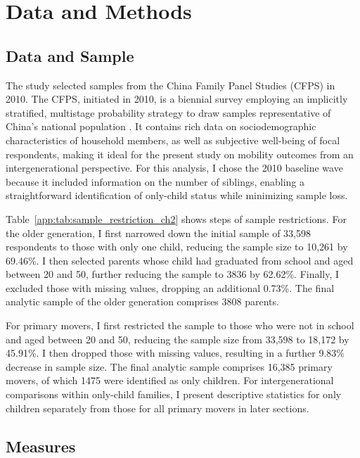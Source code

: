 \section{Data and Methods}
\label{sec:ch2-data-methods}

\subsection{Data and Sample}

The study selected samples from the China Family Panel Studies (CFPS) in 2010. The CFPS, initiated in 2010, is a biennial survey employing an implicitly stratified, multistage probability strategy to draw samples representative of China's national population \parencite{xieSamplingDesignChina2015}. It contains rich data on sociodemographic characteristics of household members, as well as subjective well-being of focal respondents, making it ideal for the present study on mobility outcomes from an intergenerational perspective. For this analysis, I chose the 2010 baseline wave because it included information on the number of siblings, enabling a straightforward identification of only-child status while minimizing sample loss.

Table~\ref{app:tab:sample_restriction_ch2} shows steps of sample restrictions. For the older generation, I first narrowed down the initial sample of 33,598 respondents to those with only one child, reducing the sample size to 10,261 by 69.46\%. I then selected parents whose child had graduated from school and aged between 20 and 50, further reducing the sample to 3836 by 62.62\%. Finally, I excluded those with missing values, dropping an additional 0.73\%. The final analytic sample of the older generation comprises 3808 parents.

For primary movers, I first restricted the sample to those who were not in school and aged between 20 and 50, reducing the sample size from 33,598 to 18,172 by 45.91\%. I then dropped those with missing values, resulting in a further 9.83\% decrease in sample size. The final analytic sample comprises 16,385 primary movers, of which 1475 were identified as only children. For intergenerational comparisons within only-child families, I present descriptive statistics for only children separately from those for all primary movers in later sections.

\subsection{Measures}


